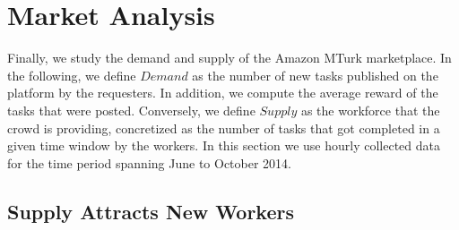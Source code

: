 \section{Market Analysis}
\label{sec:market}
Finally, we study the demand and supply of the Amazon MTurk marketplace. In the following, we define $Demand$ as the number of new tasks published on the platform by the requesters. In addition, we compute the average reward of the tasks that were posted. Conversely, we define $Supply$ as the workforce that the crowd is providing, concretized as the number of tasks that got completed in a given time window by the workers. %
In this section we use hourly collected data for the time period spanning June to October 2014.

%

\subsection{Supply Attracts New Workers} %

%

